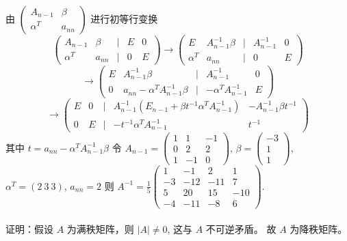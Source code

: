 	 \paragraph{} %
		 由 $\begin{pmatrix}
				 A_{n-1}  & \beta  \\
				 \alpha^T & a_{nn}
			 \end{pmatrix}$ 进行初等行变换
		 \[\begin{pmatrix}
				 A_{n-1}  & \beta  & | & E & 0 \\
				 \alpha^T & a_{nn} & | & 0 & E
			 \end{pmatrix} \to \begin{pmatrix}
				 E        & A_{n-1}^{-1}\beta & | & A_{n-1}^{-1} & 0 \\
				 \alpha^T & a_{nn}            & | & 0            & E
			 \end{pmatrix}\]
		 \[\to \begin{pmatrix}
				 E & A_{n-1}^{-1}\beta                 & | & A_{n-1}^{-1}           & 0 \\
				 0 & a_{nn}-\alpha^T A_{n-1}^{-1}\beta & | & -\alpha^T A_{n-1}^{-1} & E
			 \end{pmatrix}\]
		 \[\to \begin{pmatrix}
				 E & 0 & | & A_{n-1}^{-1}(E_{n-1}+\beta t^{-1}\alpha^T A_{n-1}^{-1}) & -A_{n-1}^{-1}\beta t^{-1} \\
				 0 & E & | & -t^{-1}\alpha^T A_{n-1}^{-1}                            & t^{-1}
			 \end{pmatrix}\]
		 其中 $t = a_{nn} - \alpha^T A_{n-1}^{-1}\beta$
		 令 $A_{n-1} = \begin{pmatrix}
				 1 & 1  & -1 \\
				 0 & 2  & 2  \\
				 1 & -1 & 0
			 \end{pmatrix}$, $\beta = \begin{pmatrix}
				 -3 \\
				 1  \\
				 1
			 \end{pmatrix}$, $\alpha^T = (2 \ 3 \ 3)$, $a_{nn}=2$
		 则 $A^{-1} = \frac{1}{5}\begin{pmatrix}
				 1  & -1  & 2   & 1   \\
				 -3 & -12 & -11 & 7   \\
				 5  & 20  & 15  & -10 \\
				 -4 & -11 & -8  & 6
			 \end{pmatrix}$.


	 \paragraph{} %
		 证明：假设 $A$ 为满秩矩阵，则 $|A| \neq 0$, 这与 $A$ 不可逆矛盾。
		 故 $A$ 为降秩矩阵。



